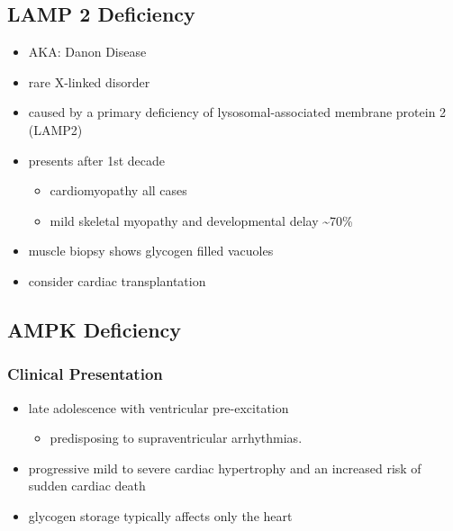 \documentclass{scrartcl}
\begin{document}
\subsection{LAMP 2 Deficiency}
\label{sec:orgb93c25b}
\begin{itemize}
\item AKA: Danon Disease
\item rare X-linked disorder
\item caused by a primary deficiency of lysosomal-associated membrane
protein 2 (LAMP2)
\item presents after 1st decade
\begin{itemize}
\item cardiomyopathy all cases
\item mild skeletal myopathy and developmental delay \textasciitilde{}70\%
\end{itemize}
\item muscle biopsy shows glycogen filled vacuoles
\item consider cardiac transplantation
\end{itemize}

\subsection{AMPK Deficiency}
\label{sec:org543947a}
\subsubsection{Clinical Presentation}
\label{sec:org4dbc95e}
\begin{itemize}
\item late adolescence with ventricular pre-excitation
\begin{itemize}
\item predisposing to supraventricular arrhythmias.
\end{itemize}
\item progressive mild to severe cardiac hypertrophy and an increased risk
of sudden cardiac death
\item glycogen storage typically affects only the heart
\end{itemize}
\end{document}
